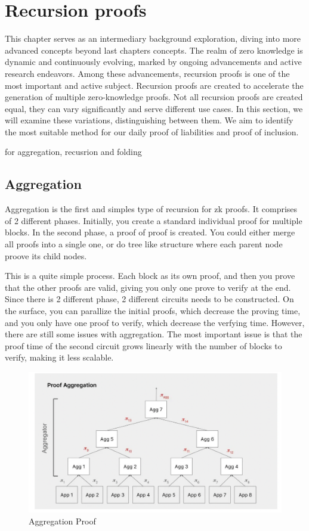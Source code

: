 
\chapter{Recursion proofs}

This chapter serves as an intermediary background exploration, 
diving into more advanced concepts beyond last chapters concepts. 
The realm of zero knowledge is dynamic and continuously evolving, 
marked by ongoing advancements and active research endeavors. Among these advancements, 
recursion proofs is one of the most important and active subject. Recursion proofs are created to accelerate
 the generation of multiple zero-knowledge proofs. 
 Not all recursion proofs are created equal, they can vary significantly and serve different use cases. 
 In this section, we will examine these variations, distinguishing between them. 
 We aim to identify the most suitable method for our daily proof of liabilities and proof of inclusion.


 \cite{Nova23} for aggregation, recusrion and folding

 \section{Aggregation}
 Aggregation is the first and simples type of recursion for zk proofs. It comprises of 2 different phases.
 Initially, you create a standard individual proof for multiple blocks. In the second phase, a proof of proof is created.
 You could either merge all proofs into a single one, or do tree like structure where each parent node proove its child nodes.

This is a quite simple process. Each block as its own proof, and then you prove that the other proofs are valid, giving you only one prove 
to verify at the end. Since there is 2 different phase, 2 different circuits needs to be constructed.
On the surface, you can parallize the initial proofs, which decrease the proving time, and you only have one proof to verify, which decrease the verfying time.
However, there are still some issues with aggregation. The most important issue is that the proof time of the second circuit grows linearly with the number of blocks to verify, making it less scalable. \cite{Nova23}
 \begin{figure}[H]
    \centering
    \includegraphics[width=130mm]{AggregationProof.png}
    \caption{Aggregation Proof \cite{TP24}}
    \label{overflow}
    \end{figure}

